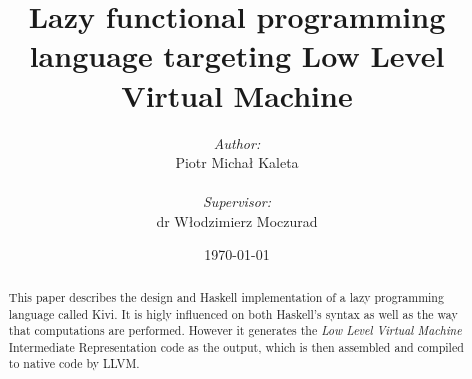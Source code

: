 \documentclass[a4paper]{report}
\begin{document}


\title{Lazy functional programming language targeting Low Level Virtual Machine}
\author{\textit{Author:}\\Piotr Micha\l{} Kaleta\\\\\emph{Supervisor:}\\dr W\l{}odzimierz Moczurad}
\date{\today}

\maketitle
{}

\newpage
\thispagestyle{empty}
\mbox{}

\Huge
\begin{abstract}
\normalsize
\center
This paper describes the design and Haskell implementation of a lazy
programming language called Kivi. It is higly influenced on both Haskell's
syntax as well as the way that computations are performed. However it generates
the \textit{Low Level Virtual Machine}\cite{wiki:llvm} Intermediate
Representation code as the output, which is then assembled and compiled to
native code by LLVM.
\end{abstract}
\end{document}
